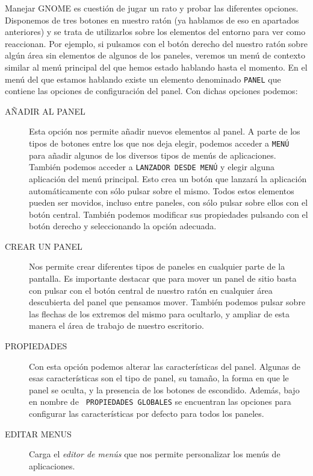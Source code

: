 \begin{figure}[hbtp]
\centering
{}
\end{figure}

Manejar  {\sf  GNOME} es  cuestión  de  jugar  un  rato y  probar  las
diferentes opciones. Disponemos  de tres botones en  nuestro ratón (ya
hablamos de  eso en  apartados anteriores) y  se trata  de utilizarlos
sobre los elementos del entorno para ver como reaccionan. Por ejemplo,
si pulsamos  con el botón derecho  del nuestro ratón sobre  algún área
sin elementos de  algunos de los paneles, veremos un  menú de contexto
similar  al menú  principal del  que  hemos estado  hablando hasta  el
momento.  En el  menú  del  que estamos  hablando  existe un  elemento
denominado {\tt PANEL} que contiene  las opciones de configuración del
panel. Con dichas opciones podemos:

\begin{description}

\item[AÑADIR AL PANEL] Esta opción nos permite añadir nuevos elementos
al  panel.  A  parte  de  los  tipos de  botones  entre  los  que  nos
deja  elegir,  podemos  acceder  a  {\tt  MENÚ}  para  añadir  algunos
de  los  diversos tipos  de  menús  de aplicaciones.  También  podemos
acceder  a  {\tt  LANZADOR  DESDE MENÚ}  y  elegir  alguna  aplicación
del  menú principal.  Esto crea  un  botón que  lanzará la  aplicación
automáticamente con sólo pulsar sobre  el mismo. Todos estos elementos
pueden ser movidos, incluso entre paneles, con sólo pulsar sobre ellos
con  el  botón  central.  También podemos  modificar  sus  propiedades
pulsando con el botón derecho y seleccionando la opción adecuada.

\item[CREAR UN PANEL] Nos permite crear diferentes tipos de paneles en
cualquier parte de la pantalla.  Es importante destacar que para mover
un panel  de sitio basta  con pulsar con  el botón central  de nuestro
ratón  en cualquier  área descubierta  del panel  que pensamos  mover.
También podemos  pulsar sobre  las flechas de  los extremos  del mismo
para ocultarlo, y ampliar de esta manera el área de trabajo de nuestro
escritorio.

\item[PROPIEDADES] Con esta opción podemos alterar las características
del  panel. Algunas  de esas  características  son el  tipo de  panel,
su  tamaño,  la forma  en  que  le panel  se  oculta,  y la  presencia
de  los  botones  de  escondido.   Además,  bajo  en  nombre  de  {\tt
PROPIEDADES GLOBALES}  se encuentran las opciones  para configurar las
características por defecto para todos los paneles.

\item[EDITAR MENUS] Carga el  {\em editor de menús} que nos permite personalizar los menús de aplicaciones.

\end{description}

